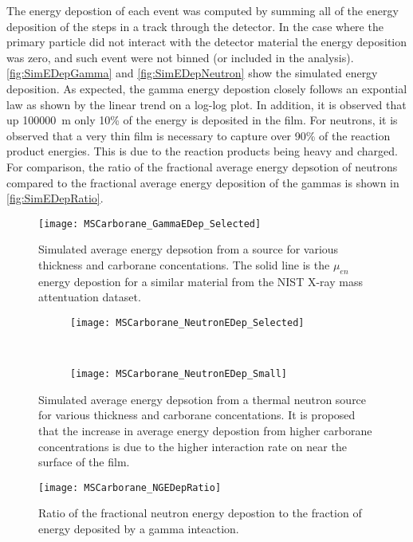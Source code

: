 \documentclass[draftcls,onecolumn]{IEEEtran}
\begin{document}
The energy depostion of each event was computed by summing all of the energy deposition of the steps in a track through the detector.
In the case where the primary particle did not interact with the detector material the energy deposition was zero, and such event were not binned (or included in the analysis).
\autoref{fig:SimEDepGamma} and  \autoref{fig:SimEDepNeutron} show the simulated energy deposition.
As expected, the gamma energy depostion closely follows an expontial law as shown by the linear trend on a log-log plot.
In addition, it is observed that up \SI{100000}{\m}  only 10\% of the  energy is deposited in the film.
For neutrons, it is observed that a very thin film is necessary to capture over 90\% of the reaction product energies.
This is due to the reaction products being heavy and charged.
For comparison, the ratio of the fractional average energy depsotion of neutrons compared to the fractional average energy deposition of the gammas is shown in \autoref{fig:SimEDepRatio}.
\begin{figure}
  \centering
  \texttt{[image: MSCarborane\_GammaEDep\_Selected]}
  \caption[Simulated Average Gamma Energy Deposition]{Simulated average energy depsotion from a  source for various thickness and carborane concentations.  The solid line is the $\mu_{en}$ energy depostion for a similar material from the NIST X-ray mass attentuation dataset.}
  \label{fig:SimEDepGamma}
\end{figure}
\begin{figure}
  \centering
  \begin{subfigure}[b]{0.45\textwidth}
  \texttt{[image: MSCarborane\_NeutronEDep\_Selected]}
  \end{subfigure}%
  ~
  \begin{subfigure}[b]{0.45\textwidth}
  \texttt{[image: MSCarborane\_NeutronEDep\_Small]}
  \end{subfigure}%
  \caption[Simulated Average Neutron Energy Deposition]{Simulated average energy depsotion from a thermal neutron source for various thickness and carborane concentations.  It is proposed that the increase in average energy depostion from higher carborane concentrations is due to the higher interaction rate on near the surface of the film.}
  \label{fig:SimEDepNeutron}
\end{figure}
\begin{figure}
  \centering
  \texttt{[image: MSCarborane\_NGEDepRatio]}
  \caption[Ratio of Frational Neutron Energy Depostion to Gamma]{Ratio of the fractional neutron energy depostion to the fraction of energy deposited by a gamma inteaction.}
  \label{fig:SimEDepRatio}
\end{figure}
\end{document}
